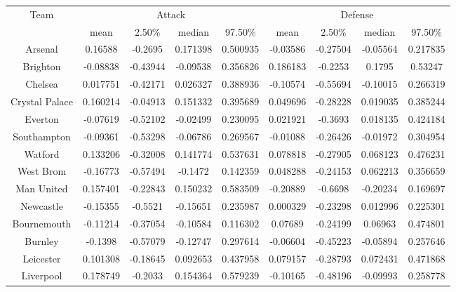 \documentclass{article}
\begin{document}
\begin{table}[!htb]
\centering
\begin{tabular}{c|cccc|cccc}
\multirow{2}{*}{Team} & \multicolumn{4}{c|}{Attack}               & \multicolumn{4}{c}{Defense}               \\
                      & mean     & 2.50\%   & median   & 97.50\%  & mean     & 2.50\%   & median   & 97.50\%  \\ \hline
Arsenal               & 0.16588  & -0.2695  & 0.171398 & 0.500935 & -0.03586 & -0.27504 & -0.05564 & 0.217835 \\
Brighton              & -0.08838 & -0.43944 & -0.09538 & 0.356826 & 0.186183 & -0.2253  & 0.1795   & 0.53247  \\
Chelsea               & 0.017751 & -0.42171 & 0.026327 & 0.388936 & -0.10574 & -0.55694 & -0.10015 & 0.266319 \\
Crystal Palace        & 0.160214 & -0.04913 & 0.151332 & 0.395689 & 0.049696 & -0.28228 & 0.019035 & 0.385244 \\
Everton               & -0.07619 & -0.52102 & -0.02499 & 0.230095 & 0.021921 & -0.3693  & 0.018135 & 0.424184 \\
Southampton           & -0.09361 & -0.53298 & -0.06786 & 0.269567 & -0.01088 & -0.26426 & -0.01972 & 0.304954 \\
Watford               & 0.133206 & -0.32008 & 0.141774 & 0.537631 & 0.078818 & -0.27905 & 0.068123 & 0.476231 \\
West Brom             & -0.16773 & -0.57494 & -0.1472  & 0.142359 & 0.048288 & -0.24153 & 0.062213 & 0.356659 \\
Man United            & 0.157401 & -0.22843 & 0.150232 & 0.583509 & -0.20889 & -0.6698  & -0.20234 & 0.169697 \\
Newcastle             & -0.15355 & -0.5521  & -0.15651 & 0.235987 & 0.000329 & -0.23298 & 0.012996 & 0.225301 \\
Bournemouth           & -0.11214 & -0.37054 & -0.10584 & 0.116302 & 0.07689  & -0.24199 & 0.06963  & 0.474801 \\
Burnley               & -0.1398  & -0.57079 & -0.12747 & 0.297614 & -0.06604 & -0.45223 & -0.05894 & 0.257646 \\
Leicester             & 0.101308 & -0.18645 & 0.092653 & 0.437958 & 0.079157 & -0.28793 & 0.072431 & 0.471868 \\
Liverpool             & 0.178749 & -0.2033  & 0.154364 & 0.579239 & -0.10165 & -0.48196 & -0.09993 & 0.258778 \\

\end{tabular}
\end{table}
\end{document}
